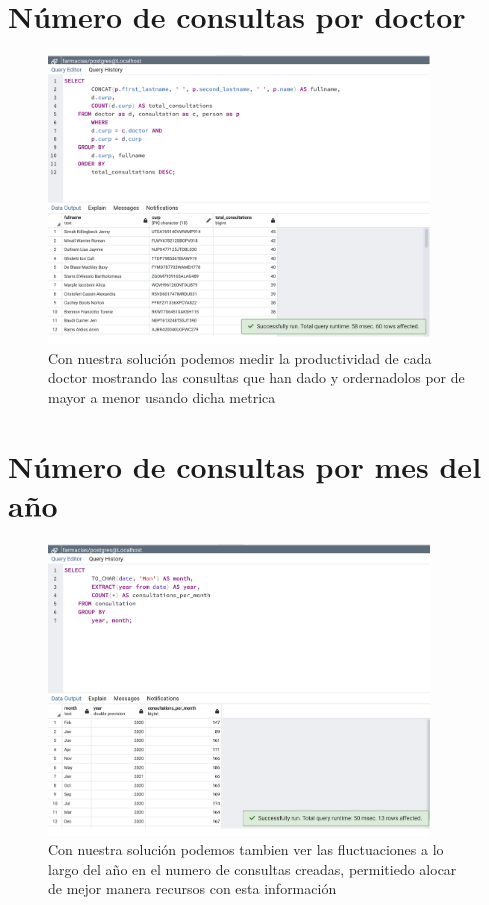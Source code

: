 \documentclass[12pt, fleqn]{report}                             %
\theoremstyle{break}                                            %
\begin{document}
        \clearpage
        \section{Número de consultas por doctor}
            
            \begin{figure}[ht]
                \includegraphics[width=0.9\textwidth]{2}
                \caption{Con nuestra solución podemos medir la productividad de cada doctor mostrando las
                consultas que han dado y ordernadolos por de mayor a menor usando dicha metrica}
            \end{figure}

        \clearpage
        \section{Número de consultas por mes del año}
            
            \begin{figure}[ht]
                \includegraphics[width=0.9\textwidth]{3}
                \caption{Con nuestra solución podemos tambien ver las fluctuaciones a lo largo del año en el
                numero de consultas creadas, permitiedo alocar de mejor manera recursos con esta información}
            \end{figure}
\end{document}
